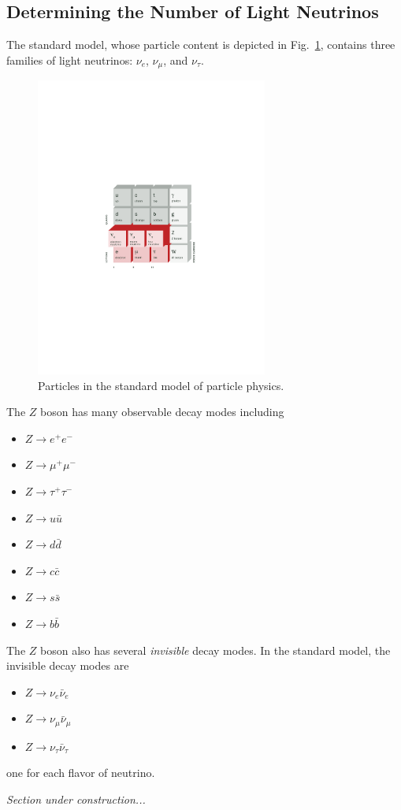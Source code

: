 \documentclass{article}
\begin{document}
\subsection{Determining the Number of Light Neutrinos}
The standard model, whose particle content is depicted in
Fig.~\ref{fig:sm}, contains three families of light neutrinos:
$\nu_e$, $\nu_{\mu}$, and $\nu_{\tau}$. 
\begin{figure}
    \centering
    \includegraphics[width=3.0in,clip=true,viewport=150 250 500 550]{neutrino_pamphlet8.pdf}
    \caption{Particles in the standard model of particle physics.}
    \label{fig:sm}
\end{figure} 
The $Z$ boson has many observable decay modes including 
\begin{itemize}
\item $Z\to e^+e^-$
\item $Z\to \mu^+\mu^-$
\item $Z\to \tau^+\tau^-$
\item $Z\to u\bar{u}$
\item $Z\to d\bar{d}$
\item $Z\to c\bar{c}$
\item $Z\to s\bar{s}$
\item $Z\to b\bar{b}$
\end{itemize}
The $Z$ boson also has several \emph{invisible} decay modes. In the standard
model, the invisible decay modes are
\begin{itemize}
\item $Z\to \nu_e\bar\nu_e$
\item $Z\to \nu_{\mu}\bar\nu_{\mu}$
\item $Z\to \nu_{\tau}\bar\nu_{\tau}$
\end{itemize}
one for each flavor of neutrino.

\emph{Section under construction...}
\end{document}
